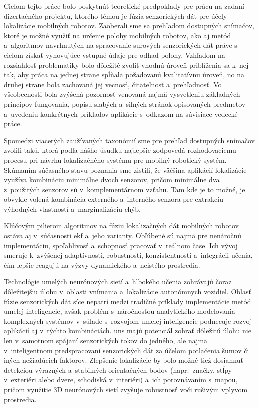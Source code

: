 Cieľom tejto práce bolo poskytnúť teoretické predpoklady pre prácu na zadaní dizertačného projektu, ktorého témou je fúzia senzorických dát pre účely lokalizácie mobilných robotov. Zaoberali sme sa prehľadom dostupných snímačov, ktoré je možné využiť na určenie polohy mobilných robotov, ako aj metód a~algoritmov navrhnutých na spracovanie surových senzorických dát práve s cieľom získať vyhovujúce vstupné údaje pre odhad polohy. Vzhľadom na rozsiahlosť problematiky bolo dôležité zvoliť vhodnú úroveň priblíženia sa k~nej tak, aby práca na jednej strane spĺňala požadovanú kvalitatívnu úroveň, no na druhej strane bola zachovaná jej vecnosť, čitateľnosť a~prehľadnosť. Vo všeobecnosti bola zvýšená pozornosť venovaná najmä vysvetleniu základných princípov fungovania, popisu slabých a~silných stránok opisovaných predmetov a~uvedeniu konkrétnych príkladov aplikácie s~odkazom na súvisiace vedecké práce.

Spomedzi viacerých zaužívaných taxonómií sme pre prehľad dostupných snímačov zvolili takú, ktorá podľa nášho úsudku najlepšie zodpovedá rozhodovaciemu procesu pri návrhu lokalizačného systému pre mobilný robotický systém. Skúmaním súčasného stavu poznania sme zistili, že väčšina aplikácií lokalizácie využíva kombináciu minimálne dvoch senzorov, pričom minimálne dva z~použitých senzorov sú v~komplementárnom vzťahu. Tam kde je to možné, je obvykle volená kombinácia externého a~interného senzora pre extrakciu výhodných vlastností a~marginalizáciu chýb.

Kľúčovým pilierom algoritmov na fúziu lokalizačných dát mobilných robotov ostáva aj v~súčasnosti \acrshort{ekf} a~jeho varianty. Obľúbené sú najmä pre nenáročnú implementáciu, spoľahlivosť a~schopnosť pracovať v~reálnom čase. Ich vývoj smeruje k~zvýšenej adaptívnosti, robustnosti, konzistentnosti a~integrácii učenia, čím lepšie reagujú na výzvy dynamického a~neistého prostredia.

Technológie umelých neurónových sietí a~hlbokého učenia zohrávajú čoraz dôležitejšiu úlohu v~oblasti vnímania a~lokalizácie autonómnych vozidiel. Oblasť fúzie senzorických dát síce nepatrí medzi tradičné príklady implementácie metód umelej inteligencie, avšak problém s~náročnosťou analytického modelovania komplexných systémov v~súlade s~rozvojom umelej inteligencie podnecuje rozvoj aplikácií aj v~týchto kombináciách\@. \acrshort{uns} majú potenciál zohrať dôležitú úlohu nie len v~samotnom spájaní senzorických tokov do jedného, ale najmä v~inteligentnom predspracovaní senzorických dát za účelom potlačenia šumov či iných nežiadúcich faktorov. Zlepšenie lokalizácie by bolo možné tiež dosiahnuť detekciou výrazných a~stabilných orientačných bodov (napr.\ značky, stĺpy v~exteriéri alebo dvere, schodiská v~interiéri) a~ich porovnávaním s~mapou, pričom využitie 3D neurónových sietí zvyšuje robustnosť voči rušivým vplyvom prostredia.

